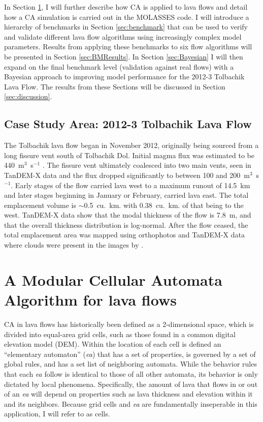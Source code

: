 \documentclass[12pt,letter]{article}
\begin{document}
	In Section \ref{sec:MOLASSES}, I will further describe how CA is applied to lava flows and detail how a CA simulation is carried out in the MOLASSES code. I will introduce a hierarchy of benchmarks in Section \ref{sec:benchmark} that can be used to verify and validate different lava flow algorithms using increasingly complex model parameters. Results from applying these benchmarks to six flow algorithms will be presented in Section \ref{sec:BMResults}. In Section \ref{sec:Bayesian} I will then expand on the final benchmark level (validation against real flows) with a Bayesian approach to improving model performance for the 2012-3 Tolbachik Lava Flow. The results from these Sections will be discussed in Section \ref{sec:discussion}.
	
	\subsection{Case Study Area: 2012-3 Tolbachik Lava Flow}
The Tolbachik lava flow began in November 2012, originally being sourced from a long fissure vent south of Tolbachik Dol. Initial magma flux was estimated to be 440~m$^3$~s$^{-1}$ \citep{belousov2015overview}. The fissure vent ultimately coalesced into two main vents, seen in TanDEM-X data and the flux dropped significantly to between 100 and 200~m$^3$~s$^{-1}$. Early stages of the flow carried lava west to a maximum runout of 14.5~km and later stages beginning in January or February, carried lava east. The total emplacement volume is $\sim$0.5~cu.~km. with 0.38~cu.~km. of that being to the west. TanDEM-X data show that the modal thickness of the flow is 7.8~m, and that the overall thickness distribution is log-normal. After the flow ceased, the total emplacement area was mapped using orthophotos and TanDEM-X data where clouds were present in the images by \citet{kubanek2015lava}.
	


\section{A Modular Cellular Automata Algorithm for lava flows}\label{sec:MOLASSES}

CA in lava flows has historically been defined as a 2-dimensional space, which is divided into equal-area grid cells, such as those found in a common digital elevation model (DEM). Within the location of each cell is defined an ``elementary automaton'' (\textit{ea}) that has a set of properties, is governed by a set of global rules, and has a set list of neighboring automata. While the behavior rules that each \textit{ea} follow is identical to those of all other automata, its behavior is only dictated by local phenomena. Specifically, the amount of lava that flows in or out of an \textit{ea} will depend on properties such as lava thickness and elevation within it and its neighbors. Because grid cells and \textit{ea} are fundamentally inseperable in this application, I will refer to  as cells.
\end{document}
